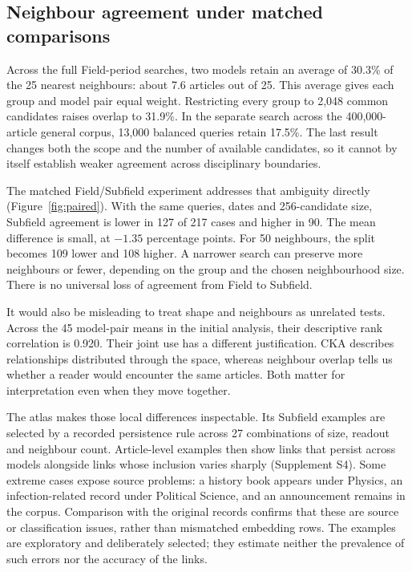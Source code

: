 \documentclass[12pt]{article}
\begin{document}
\subsection{Neighbour agreement under matched comparisons}
Across the full Field-period searches, two models retain an average of 30.3\% of the 25 nearest neighbours: about 7.6 articles out of 25. This average gives each group and model pair equal weight. Restricting every group to 2,048 common candidates raises overlap to 31.9\%. In the separate search across the 400,000-article general corpus, 13,000 balanced queries retain 17.5\%. The last result changes both the scope and the number of available candidates, so it cannot by itself establish weaker agreement across disciplinary boundaries.

The matched Field/Subfield experiment addresses that ambiguity directly (Figure~\ref{fig:paired}). With the same queries, dates and 256-candidate size, Subfield agreement is lower in 127 of 217 cases and higher in 90. The mean difference is small, at $-1.35$ percentage points. For 50 neighbours, the split becomes 109 lower and 108 higher. A narrower search can preserve more neighbours or fewer, depending on the group and the chosen neighbourhood size. There is no universal loss of agreement from Field to Subfield.

It would also be misleading to treat shape and neighbours as unrelated tests. Across the 45 model-pair means in the initial analysis, their descriptive rank correlation is 0.920. Their joint use has a different justification. CKA describes relationships distributed through the space, whereas neighbour overlap tells us whether a reader would encounter the same articles. Both matter for interpretation even when they move together.

The atlas makes those local differences inspectable. Its Subfield examples are selected by a recorded persistence rule across 27 combinations of size, readout and neighbour count. Article-level examples then show links that persist across models alongside links whose inclusion varies sharply (Supplement S4). Some extreme cases expose source problems: a history book appears under Physics, an infection-related record under Political Science, and an announcement remains in the corpus. Comparison with the original records confirms that these are source or classification issues, rather than mismatched embedding rows. The examples are exploratory and deliberately selected; they estimate neither the prevalence of such errors nor the accuracy of the links.
\end{document}
